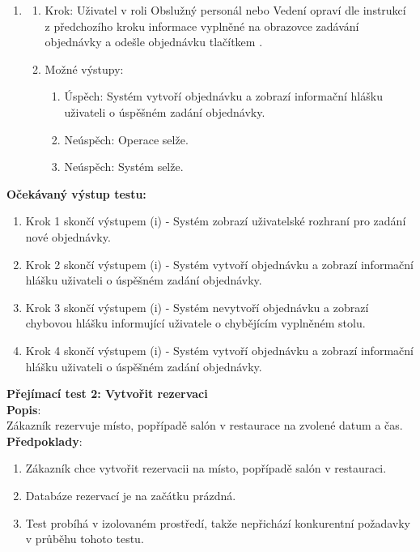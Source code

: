 \begin{enumerate}
	\item 
	\begin{enumerate}
		\item Krok: Uživatel v roli Obslužný personál nebo Vedení opraví dle instrukcí z předchozího kroku informace vyplněné na obrazovce zadávání objednávky a odešle objednávku tlačítkem .
		\item Možné výstupy:
		\begin{enumerate}
			\item Úspěch: Systém vytvoří objednávku a zobrazí informační hlášku uživateli o úspěšném zadání objednávky.
			\item Neúspěch: Operace selže.
			\item Neúspěch: Systém selže.
		\end{enumerate} 
	\end{enumerate}
\end{enumerate}

\newpage
\textbf{Očekávaný výstup testu:} \\
\begin{enumerate}
	\item Krok 1 skončí výstupem (i) - Systém zobrazí uživatelské rozhraní pro zadání nové objednávky.
	\item Krok 2 skončí výstupem (i) - Systém vytvoří objednávku a zobrazí informační hlášku uživateli o úspěšném zadání objednávky.
	\item Krok 3 skončí výstupem (i) - Systém nevytvoří objednávku a zobrazí chybovou hlášku informující uživatele o chybějícím vyplněném stolu.
	\item Krok 4 skončí výstupem (i) - Systém vytvoří objednávku a zobrazí informační hlášku uživateli o úspěšném zadání objednávky.
\end{enumerate}


{\large\textbf{Přejímací test 2: Vytvořit rezervaci}} \\
\textbf{Popis}: \\\indent Zákazník rezervuje místo, popřípadě salón v restaurace na zvolené datum a čas. \\

\textbf{Předpoklady}: 
\begin{enumerate}
	\item Zákazník chce vytvořit rezervacii na místo, popřípadě salón v restauraci.
	\item Databáze rezervací je na začátku prázdná.
	\item Test probíhá v izolovaném prostředí, takže nepřichází konkurentní požadavky v průběhu tohoto testu.
\end{enumerate}

